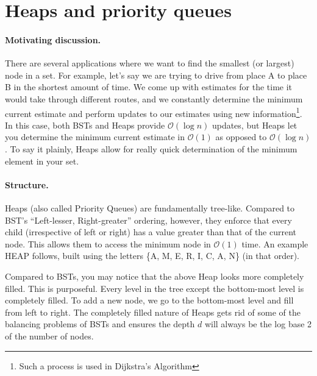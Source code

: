 \documentclass[10pt]{article}
\begin{document}
\section{Heaps and priority queues}
\paragraph{Motivating discussion.}
There are several applications where we want to find the smallest (or largest) node in a set.
For example, let's say we are trying to drive from place A to place B
in the shortest amount of time.
We come up with estimates for the time it would take through different routes,
and we constantly determine the minimum current
estimate and perform updates to our estimates using new
information\footnote{Such a process is used in Dijkstra's Algorithm}.
In this case, both BSTs and Heaps
provide $\mathcal{O}(\log{}n)$ updates,
but Heaps let you determine the minimum current estimate in $\mathcal{O}(1)$
as opposed to $\mathcal{O}(\log{}n)$.
To say it plainly, Heaps allow for really quick determination of the
minimum element in your set.

\paragraph{Structure.}
Heaps (also called Priority Queues) are fundamentally tree-like.
Compared to BST's ``Left-lesser, Right-greater'' ordering, however, they
enforce that every child (irrespective of left or right)
has a value greater than that of the current node.
This allows them to access the minimum node in $\mathcal{O}(1)$ time.
An example HEAP follows, built using the letters \{A, M, E, R, I, C, A, N\}
(in that order).
\begin{center}
\end{center}

Compared to BSTs, you may notice that the above Heap looks more completely filled.
This is purposeful.
Every level in the tree except the bottom-most level is completely filled.
To add a new node, we go to the bottom-most level and fill from left to right.
The completely filled nature of Heaps gets rid of some of the
balancing problems of BSTs and ensures the depth $d$
will always be the log base 2 of the number of nodes.
\end{document}
